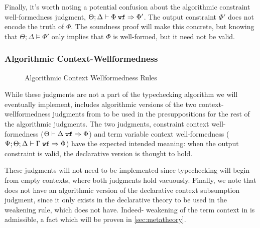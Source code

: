 Finally, it's worth noting a potential confusion about the algorithmic constraint well-formedness judgment, $\Theta ; \Delta \vdash \Phi \; \texttt{wf} \Rightarrow \Phi'$.
The output constraint $\Phi'$ does not encode the truth of $\Phi$. The soundness proof will make this concrete, but knowing that $\Theta ; \Delta \vDash \Phi'$ only implies that $\Phi$ is well-formed, but it need not be valid.

\subsubsection{Algorithmic Context-Wellformedness}
\begin{figure}

\caption{Algorithmic Context Wellformedness Rules}
\label{fig:bilambdaamor-ctx-wf-rules}
\end{figure}

While these judgments are not a part of the typechecking algorithm we will eventually implement, \bilambdaamor includes algorithmic versions of the two context-wellformedness judgments from \dlambdaamor to be used in the presuppositions for the rest of the algorithmic judgments. The two judgments, constraint context well-formedness ($\Theta \vdash \Delta \; \texttt{wf} \Rightarrow \Phi$) and term variable context well-formedness ($\Psi ; \Theta ; \Delta \vdash \Gamma \; \texttt{wf} \Rightarrow \Phi$) have the expected intended meaning: when the output constraint is valid, the declarative version is thought to hold.

These judgments will not need to be implemented since typechecking will begin from empty contexts, where both judgments hold vacuously. Finally, we note that \bilambdaamor does not have an algorithmic version of the declarative context subsumption judgment, since it only exists in the declarative theory to be used in the weakening rule, which \bilambdaamor does not have. Indeed- weakening of the term context in \bilambdaamor is admissible, a fact which will be proven in \autoref{sec:metatheory}.


